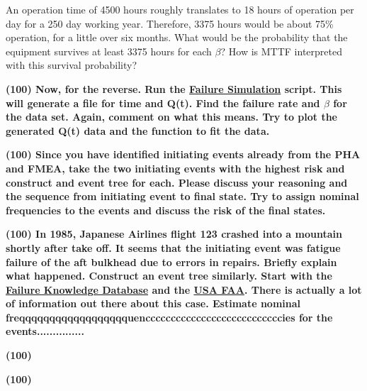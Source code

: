 \documentclass[11pt,a4paper]{article}
\begin{document}
\begin{enumerate}[leftmargin=*,topsep=0pt,font=\bfseries]
{        \vspace{0.05in}
    \item[]
        An operation time of 4500 hours roughly translates to 18 hours of operation per day for a 250 day working year. Therefore, 3375 hours would be about 75\% operation, for a little over six months. What would be the probability that the equipment survives at least 3375 hours for each $\beta$? How is MTTF interpreted with this survival probability?}
        \vspace{\baselineskip}
        \newpage
    \item\textbf{(100) Now, for the reverse. Run the \href{https://github.com/TheDoctorRAB/education/tree/master/src}{Failure Simulation} script. This will generate a file for time and Q(t). Find the failure rate and $\beta$ for the data set. Again, comment on what this means. Try to plot the generated Q(t) data and the function to fit the data.}
        \vspace{\baselineskip}
        \newpage
    \item\textbf{(100) Since you have identified initiating events already from the PHA and FMEA, take the two initiating events with the highest risk and construct and event tree for each. Please discuss your reasoning and the sequence from initiating event to final state.  Try to assign nominal frequencies to the events and discuss the risk of the final states.}
        \vspace{\baselineskip}
        \newpage
    \item\textbf{(100) In 1985, Japanese Airlines flight 123 crashed into a mountain shortly after take off. It seems that the initiating event was fatigue failure of the aft bulkhead due to errors in repairs. Briefly explain what happened. Construct an event tree similarly. Start with the \href{http://www.shippai.org/fkd/en/cfen/CB1071008.html}{Failure Knowledge Database} and the \href{https://lessonslearned.faa.gov/ll_adsearch_results.cfm?TabID=5}{USA FAA}. There is actually a lot of
        information out there about this case. Estimate nominal     freqqqqqqqqqqqqqqqqqquencccccccccccccccccccccccccccies for the events...............      }
        \vspace{\baselineskip}
        \newpage
    \item\textbf{(100) }
        \vspace{\baselineskip}
        \newpage
    \item\textbf{(100) }
        \vspace{\baselineskip}
\end{enumerate}

\newpage 


\setlength{\bibhang}{0pt}

\end{document}
